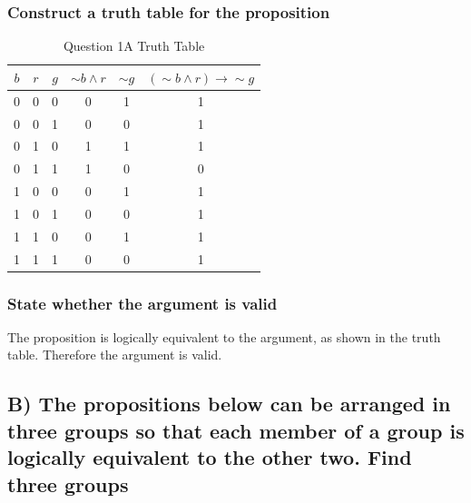\documentclass[12pt,a4paper]{article}
\begin{document}
\subsubsection{Construct a truth table for the proposition}
\begin{table}[h]
\centering
\caption{Question 1A Truth Table}
\begin{tabular}{c|c|c|c|c|c}
$b$ & $r$ & $g$ & $\sim{b} \wedge r$ & $\sim{g}$ & $(\sim{b} \wedge r) \rightarrow \sim{g}$ \\
\hline
0 & 0 & 0 & 0 & 1 & 1 \\
\hline
0 & 0 & 1 & 0 & 0 & 1 \\
\hline
0 & 1 & 0 & 1 & 1 & 1 \\
\hline
0 & 1 & 1 & 1 & 0 & 0 \\
\hline
1 & 0 & 0 & 0 & 1 & 1 \\
\hline
1 & 0 & 1 & 0 & 0 & 1 \\
\hline
1 & 1 & 0 & 0 & 1 & 1 \\
\hline
1 & 1 & 1 & 0 & 0 & 1 \\
\hline
\end{tabular}
\end{table}

\subsubsection{State whether the argument is valid}

The proposition is logically equivalent to the argument, as shown in the truth table. Therefore the argument is valid.


\newpage
\subsection{B) The propositions below can be arranged in three groups so that each member of a group is logically equivalent to the other two. Find three groups}
\end{document}
